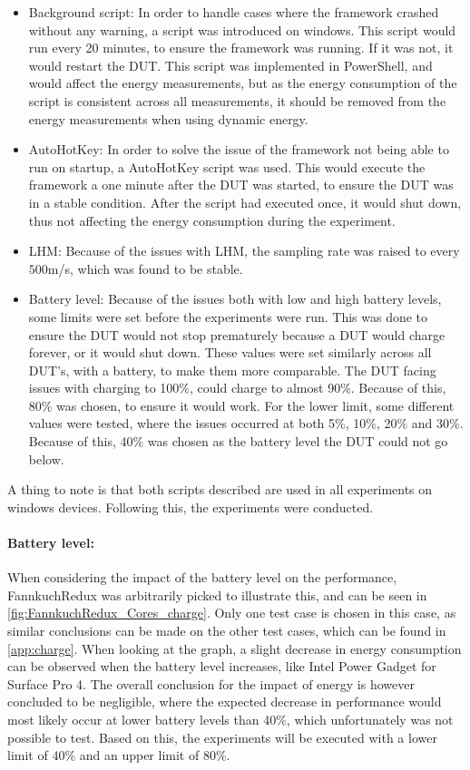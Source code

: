 \begin{itemize}
    \item Background script: In order to handle cases where the framework crashed without any warning, a script was introduced on windows. This script would run every 20 minutes, to ensure the framework was running. If it was not, it would restart the DUT. This script was implemented in PowerShell, and would affect the energy measurements, but as the energy consumption of the script is consistent across all measurements, it should be removed from the energy measurements when using dynamic energy.
    \item AutoHotKey: In order to solve the issue of the framework not being able to run on startup, a AutoHotKey script was used. This would execute the framework a one minute after the DUT was started, to ensure the DUT was in a stable condition. After the script had executed once, it would shut down, thus not affecting the energy consumption during the experiment.
    \item LHM: Because of the issues with LHM, the sampling rate was raised to every $500$m/s, which was found to be stable.
    \item Battery level: Because of the issues both with low and high battery levels, some limits were set before the experiments were run. This was done to ensure the DUT would not stop prematurely because a DUT would charge forever, or it would shut down. These values were set similarly across all DUT's, with a battery, to make them more comparable. The DUT facing issues with charging to 100\%, could charge to almost 90\%. Because of this, 80\% was chosen, to ensure it would work. For the lower limit, some different values were tested, where the issues occurred at both 5\%, 10\%, 20\% and 30\%. Because of this, 40\% was chosen as the battery level the DUT could not go below.
\end{itemize}

A thing to note is that both scripts described are used in all experiments on windows devices. Following this, the experiments were conducted.



\paragraph{Battery level:} When considering the impact of the battery level on the performance, FannkuchRedux was arbitrarily picked to illustrate this, and can be seen in \cref{fig:FannkuchRedux_Cores_charge}. Only one test case is chosen in this case, as similar conclusions can be made on the other test cases, which can be found in \cref{app:charge}. When looking at the graph, a slight decrease in energy consumption can be observed when the battery level increases, like Intel Power Gadget for Surface Pro 4. The overall conclusion for the impact of energy is however concluded to be negligible, where the expected decrease in performance would most likely occur at lower battery levels than 40\%, which unfortunately was not possible to test. Based on this, the experiments will be executed with a lower limit of 40\% and an upper limit of 80\%.


